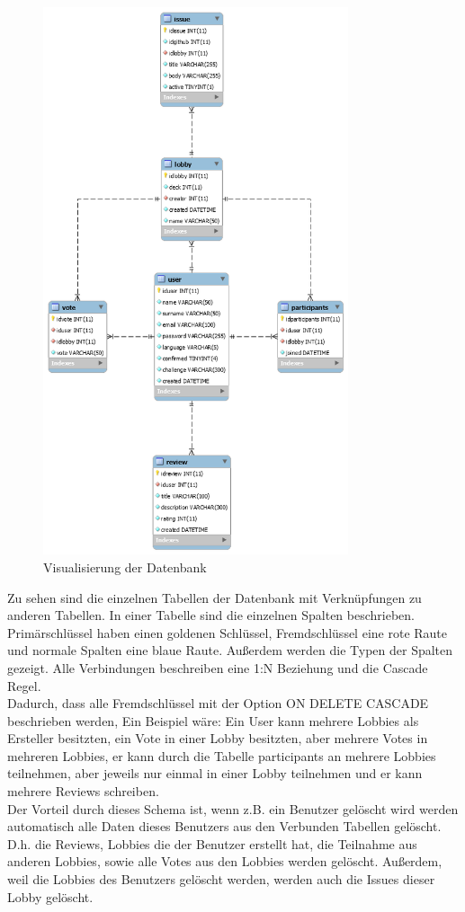 \begin{figure}[H]
	\centering
  \includegraphics[width=0.8\textwidth]{images/database.png}
	\caption{Visualisierung der Datenbank}
	\label{datenbank}
\end{figure}

Zu sehen sind die einzelnen Tabellen der Datenbank mit Verknüpfungen zu anderen Tabellen. In einer Tabelle sind die einzelnen Spalten beschrieben. Primärschlüssel haben einen goldenen Schlüssel, Fremdschlüssel eine rote Raute und normale Spalten eine blaue Raute. Außerdem werden die Typen der Spalten gezeigt. Alle Verbindungen beschreiben eine 1:N Beziehung und die Cascade Regel.\\
Dadurch, dass alle Fremdschlüssel mit der Option ON DELETE CASCADE beschrieben werden, 
Ein Beispiel wäre: Ein User kann mehrere Lobbies als Ersteller besitzten, ein Vote in einer Lobby besitzten, aber mehrere Votes in mehreren Lobbies, er kann durch die Tabelle participants an mehrere Lobbies teilnehmen, aber jeweils nur einmal in einer Lobby teilnehmen und er kann mehrere Reviews schreiben.\\

Der Vorteil durch dieses Schema ist, wenn z.B. ein Benutzer gelöscht wird werden automatisch alle Daten dieses Benutzers aus den Verbunden Tabellen gelöscht. D.h. die Reviews, Lobbies die der Benutzer erstellt hat, die Teilnahme aus anderen Lobbies, sowie alle Votes aus den Lobbies werden gelöscht. Außerdem, weil die Lobbies des Benutzers gelöscht werden, werden auch die Issues dieser Lobby gelöscht.